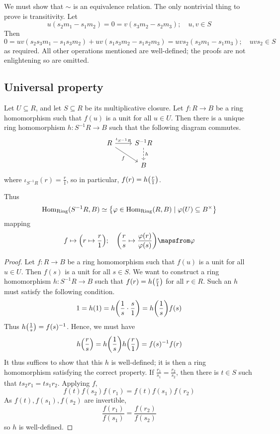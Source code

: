 We must show that \( \sim \) is an equivalence relation.
The only nontrivial thing to prove is transitivity.
Let
\[ u(s_2 m_1 - s_1 m_2) = 0 = v(s_3 m_2 - s_2 m_3);\quad u, v \in S \]
Then
\[ 0 = uv(s_2 s_3 m_1 - s_1 s_3 m_2) + uv(s_1 s_3 m_2 - s_1 s_2 m_3) = uvs_2(s_3 m_1 - s_1 m_3);\quad uvs_2 \in S \]
as required.
All other operations mentioned are well-defined; the proofs are not enlightening so are omitted.

\subsection{Universal property}
\begin{proposition}
    Let \( U \subseteq R \), and let \( S \subseteq R \) be its multiplicative closure.
    Let \( f : R \to B \) be a ring homomorphism such that \( f(u) \) is a unit for all \( u \in U \).
    Then there is a unique ring homomorphism \( h : S^{-1}R \to B \) such that the following diagram commutes.
    \[\begin{tikzcd}
        R & {S^{-1}R} \\
        & B
        \arrow["{\iota_{S^{-1}R}}", from=1-1, to=1-2]
        \arrow["h", dashed, from=1-2, to=2-2]
        \arrow["f"', from=1-1, to=2-2]
    \end{tikzcd}\]
    where \( \iota_{S^{-1}R}(r) = \frac{r}{1} \), so in particular, \( f(r) = h\qty(\frac{r}{1}) \).
\end{proposition}
Thus
\[ \operatorname{Hom}_{\text{Ring}}(S^{-1}R, B) \simeq \qty{\varphi \in \operatorname{Hom}_{\text{Ring}}(R, B) \mid \varphi(U) \subseteq B^\times} \]
mapping
\[ f \mapsto \qty(r \mapsto \frac{r}{1});\quad \qty(\frac{r}{s} \mapsto \frac{\varphi(r)}{\varphi(s)}) \mapsfrom \varphi \]
\begin{proof}
    Let \( f : R \to B \) be a ring homomorphism such that \( f(u) \) is a unit for all \( u \in U \).
    Then \( f(s) \) is a unit for all \( s \in S \).
    We want to construct a ring homomorphism \( h : S^{-1}R \to B \) such that \( f(r) = h\qty(\frac{r}{1}) \) for all \( r \in R \).
    Such an \( h \) must satisfy the following condition.
    \[ 1 = h(1) = h\qty(\frac{1}{s} \cdot \frac{s}{1}) = h\qty(\frac{1}{s}) f(s) \]
    Thus \( h\qty(\frac{1}{s}) = f(s)^{-1} \).
    Hence, we must have
    \[ h\qty(\frac{r}{s}) = h\qty(\frac{1}{s}) h\qty(\frac{r}{1}) = f(s)^{-1} f(r) \]
    It thus suffices to show that this \( h \) is well-defined; it is then a ring homomorphism satisfying the correct property.
    If \( \frac{r_1}{s_1} = \frac{r_2}{s_2} \), then there is \( t \in S \) such that \( t s_2 r_1 = t s_1 r_2 \).
    Applying \( f \),
    \[ f(t) f(s_2) f(r_1) = f(t) f(s_1) f(r_2) \]
    As \( f(t), f(s_1), f(s_2) \) are invertible,
    \[ \frac{f(r_1)}{f(s_1)} = \frac{f(r_2)}{f(s_2)} \]
    so \( h \) is well-defined.
\end{proof}
